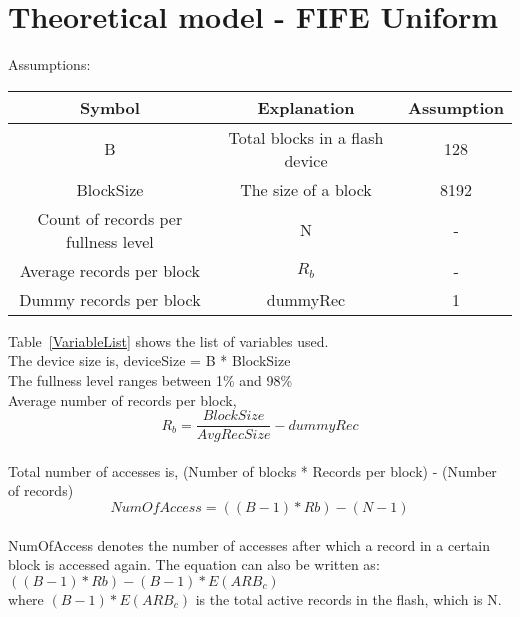\section{Theoretical model - FIFE Uniform}

Assumptions:\\

\begin{center}
\label{VariableList}
   \begin{tabular} {|  c | c | c | }
       \hline
	{\bf Symbol} & {\bf Explanation} & {\bf Assumption} \\ \hline
	B & Total blocks in a flash device & 128 \\ \hline
	BlockSize & The size of a block & 8192 \\ \hline
	Count of records per fullness level & N & - \\ \hline
	Average records per block & $R_b$ & - \\ \hline
	Dummy records per block & dummyRec & 1 \\ \hline
   \end{tabular}
\end{center}

Table~\ref{VariableList} shows the list of variables used. \\


The device size is, deviceSize = B * BlockSize\\
The fullness level ranges between 1\% and 98\% \\
Average number of records per block, 
\begin{equation}R_b = \frac{BlockSize}{AvgRecSize} - dummyRec\end{equation}\\


Total number of accesses is, (Number of blocks * Records per block) - (Number of records)\\
\begin{equation}NumOfAccess = ((B-1) * Rb) -  (N-1)\end{equation}\\
NumOfAccess denotes the number of accesses after which a record in a certain block is accessed again. The equation can also be written as: $((B-1) * Rb) - (B-1) * E(ARB_c)$\\
where $(B-1) * E(ARB_c)$ is the total active records in the flash, which is N.\\
\\

